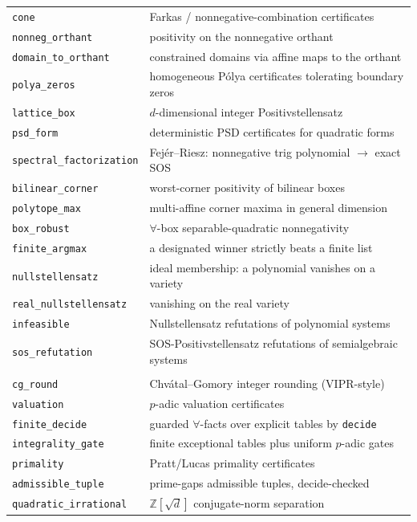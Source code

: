 {\begin{longtable}{@{}p{}p{}@{}}
\texttt{cone} & Farkas / nonnegative-combination certificates \\
\texttt{nonneg\_orthant} & positivity on the nonnegative orthant \\
\texttt{domain\_to\_orthant} & constrained domains via affine maps to the orthant \\
\texttt{polya\_zeros} & homogeneous P\'olya certificates tolerating boundary zeros \\
\texttt{lattice\_box} & $d$-dimensional integer Positivstellensatz \\
\texttt{psd\_form} & deterministic PSD certificates for quadratic forms \\
\texttt{spectral\_factorization} & Fej\'er--Riesz: nonnegative trig polynomial $\to$ exact SOS \\
\texttt{bilinear\_corner} & worst-corner positivity of bilinear boxes \\
\texttt{polytope\_max} & multi-affine corner maxima in general dimension \\
\texttt{box\_robust} & $\forall$-box separable-quadratic nonnegativity \\
\texttt{finite\_argmax} & a designated winner strictly beats a finite list \\
\texttt{nullstellensatz} & ideal membership: a polynomial vanishes on a variety \\
\texttt{real\_nullstellensatz} & vanishing on the real variety \\
\texttt{infeasible} & Nullstellensatz refutations of polynomial systems \\
\texttt{sos\_refutation} & SOS-Positivstellensatz refutations of semialgebraic systems \\
\addlinespace
\multicolumn{2}{@{}l}{\emph{Discrete and arithmetic}} \\
\texttt{cg\_round} & Chv\'atal--Gomory integer rounding (VIPR-style) \\
\texttt{valuation} & $p$-adic valuation certificates \\
\texttt{finite\_decide} & guarded $\forall$-facts over explicit tables by \texttt{decide} \\
\texttt{integrality\_gate} & finite exceptional tables plus uniform $p$-adic gates \\
\texttt{primality} & Pratt/Lucas primality certificates \\
\texttt{admissible\_tuple} & prime-gaps admissible tuples, decide-checked \\
\texttt{quadratic\_irrational} & $\mathbb{Z}[\sqrt d]$ conjugate-norm separation \\

\end{longtable}}
